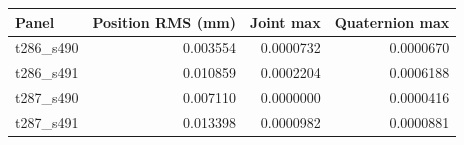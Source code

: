 \begin{tabular}{lrrr}
\toprule
Panel & Position RMS (mm) & Joint max & Quaternion max\\
\midrule
t286_s490 & 0.003554 & 0.0000732 & 0.0000670\\
t286_s491 & 0.010859 & 0.0002204 & 0.0006188\\
t287_s490 & 0.007110 & 0.0000000 & 0.0000416\\
t287_s491 & 0.013398 & 0.0000982 & 0.0000881\\
\bottomrule
\end{tabular}
